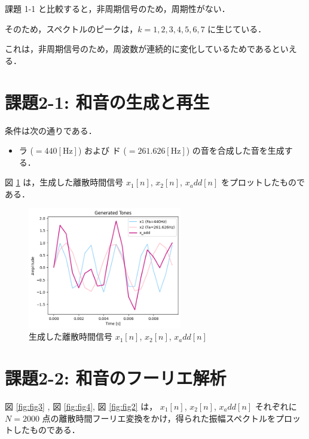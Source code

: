 \documentclass[fleqn, a4paper. 12pt]{jsarticle}
\begin{document}
    課題 1-1 と比較すると，非周期信号のため，周期性がない．

    そのため，スペクトルのピークは，$k = 1, 2, 3, 4, 5, 6, 7$ に生じている．

    これは，非周期信号のため，周波数が連続的に変化しているためであるといえる．

  \newpage
  \section*{課題2-1: 和音の生成と再生}

  条件は次の通りである．

  \begin{itemize}
    \item ラ ($ = 440 [\mathrm{Hz}]$) および ド ($ = 261.626 [\mathrm{Hz}]$) の音を合成した音を生成する．
  \end{itemize}

  図 \ref{fig:fig1} は，生成した離散時間信号 $x_1[n]$, $x_2[n]$, $x_add[n]$ をプロットしたものである．

  \begin{figure}[!h]
    \centering
    \includegraphics[width=0.6\textwidth]{fig_1.png}
    \caption{生成した離散時間信号 $x_1[n]$, $x_2[n]$, $x_add[n]$}
    \label{fig:fig1}
  \end{figure}

  \newpage
  \section*{課題2-2: 和音のフーリエ解析}

  図 \ref{fig:fig3} , 図 \ref{fig:fig4}, 図 \ref{fig:fig2} は， $x_1[n]$, $x_2[n]$, $x_add[n]$ それぞれに $N = 2000$ 点の離散時間フーリエ変換をかけ，得られた振幅スペクトルをプロットしたものである．
\end{document}
